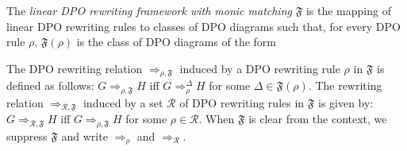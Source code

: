 \begin{definition}
    The \emph{linear DPO rewriting framework with monic matching} $\mathfrak{F}$ is the mapping of linear DPO rewriting rules to classes of DPO diagrams such that, for every DPO rule $\rho$, $\mathfrak{F}(\rho)$ is the class of DPO diagrams of the form
    \begin{center}
    \end{center}
    The DPO rewriting relation $\mathop{\Rightarrow}_{\rho,\mathfrak{F}}$ induced by a DPO rewriting rule $\rho$ in $\mathfrak{F}$ is defined as follows: $G \mathop{\Rightarrow}_{\rho,\mathfrak{F}} H$ iff $G \mathop{\Rightarrow}_\rho^\Delta H$ for some $\Delta \mathop{\in} \mathfrak{F}(\rho)$. 
    The rewriting relation $\mathop{\Rightarrow}_{\mathcal{R},\mathfrak{F}}$ induced by a set $\mathcal{R}$ of DPO rewriting rules in $\mathfrak{F}$ is given by: $G \mathop{\Rightarrow}_{\mathcal{R},\mathfrak{F}} H$ iff $G \mathop{\Rightarrow}_{\rho,\mathfrak{F}} H$ for some $\rho \mathop{\in} \mathcal{R}$. When $\mathfrak{F}$ is clear from the context, we 
    suppress $\mathfrak{F}$ and 
    write $\mathop{\Rightarrow}_{\rho}$ and $\mathop{\Rightarrow}_{\mathcal{R}}$.
\end{definition}